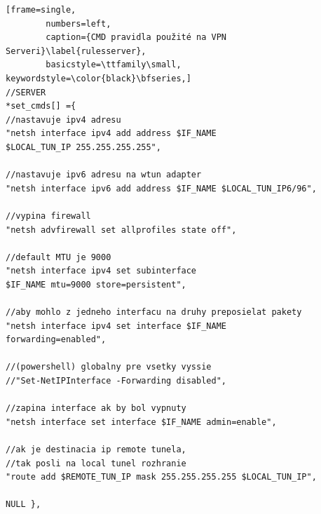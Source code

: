 \begin{minipage}{\linewidth} 	
	\begin{lstlisting}[frame=single,
		numbers=left,
		caption={CMD pravidla použité na VPN Serveri}\label{rulesserver},
		basicstyle=\ttfamily\small, keywordstyle=\color{black}\bfseries,]
//SERVER
*set_cmds[] ={
//nastavuje ipv4 adresu
"netsh interface ipv4 add address $IF_NAME 
$LOCAL_TUN_IP 255.255.255.255", 
	
//nastavuje ipv6 adresu na wtun adapter   
"netsh interface ipv6 add address $IF_NAME $LOCAL_TUN_IP6/96", 
	      
//vypina firewall 
"netsh advfirewall set allprofiles state off", 
	
//default MTU je 9000                    
"netsh interface ipv4 set subinterface 
$IF_NAME mtu=9000 store=persistent",
	 
//aby mohlo z jedneho interfacu na druhy preposielat pakety 
"netsh interface ipv4 set interface $IF_NAME 
forwarding=enabled",
	
//(powershell) globalny pre vsetky vyssie 
//"Set-NetIPInterface -Forwarding disabled", 
	
//zapina interface ak by bol vypnuty
"netsh interface set interface $IF_NAME admin=enable",  
	
//ak je destinacia ip remote tunela, 
//tak posli na local tunel rozhranie    
"route add $REMOTE_TUN_IP mask 255.255.255.255 $LOCAL_TUN_IP", 
	   
NULL },
	\end{lstlisting}
\end{minipage}\\ 

